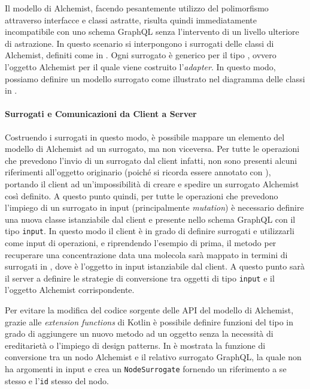Il modello di Alchemist, facendo pesantemente utilizzo del polimorfismo attraverso interfacce e classi astratte, risulta quindi immediatamente
incompatibile con uno schema GraphQL senza l'intervento di un livello ulteriore di astrazione. In questo scenario si interpongono i surrogati delle 
classi di Alchemist, definiti come in . Ogni surrogato è generico per il tipo , ovvero l'oggetto Alchemist
per il quale viene costruito l'\textit{adapter}. In questo modo, possiamo definire un modello surrogato come illustrato nel diagramma delle classi in
.


\paragraph{Surrogati e Comunicazioni da Client a Server}
Costruendo i surrogati in questo modo, è possibile mappare un elemento del modello di Alchemist ad un surrogato, ma non viceversa. Per tutte le operazioni
che prevedono l'invio di un surrogato dal client infatti, non sono presenti alcuni riferimenti all'oggetto originario (poiché si ricorda essere annotato con 
), portando il client ad un'impossibilità di creare e spedire un surrogato Alchemist così definito.
A questo punto quindi, per tutte le operazioni che prevedono l'impiego di un surrogato in input (principalmente
\textit{mutation}) è necessario definire una nuova classe istanziabile dal client e presente nello schema GraphQL con il tipo \texttt{input}. 
In questo modo il client è in grado di definire surrogati e utilizzarli come input di operazioni, e riprendendo l'esempio di prima, il metodo
per recuperare una concentrazione data una molecola sarà mappato in termini di surrogati in ,
dove  è l'oggetto in input istanziabile dal client. A questo punto sarà il server a definire le strategie di conversione
tra oggetti di tipo \texttt{input} e il l'oggetto Alchemist corrispondente.

Per evitare la modifica del codice sorgente delle \ac{API} del modello di Alchemist, grazie alle \textit{extension functions} di Kotlin è possibile
definire funzioni del tipo  in grado di aggiungere un nuovo metodo ad un oggetto senza la necessità di ereditarietà
o l'impiego di design patterns. In  è mostrata la funzione di conversione tra un nodo Alchemist e il relativo
surrogato GraphQL, la quale non ha argomenti in input e crea un \texttt{NodeSurrogate} fornendo un riferimento a se stesso e l'\texttt{id} stesso del nodo.

